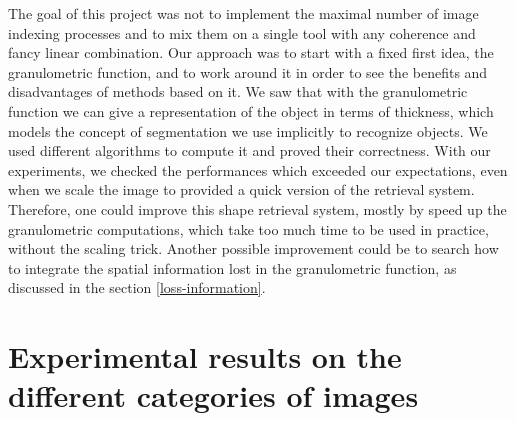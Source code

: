 The goal of this project was not to implement the maximal number of image indexing processes and to mix them on a single tool with any coherence and fancy linear combination. Our approach was to start with a fixed first idea, the granulometric function, and to work around it in order to see the benefits and disadvantages of methods based on it. We saw that with the granulometric function we can give a representation of the object in terms of thickness, which models the concept of segmentation we use implicitly to recognize objects. We used different algorithms to compute it and proved their correctness. With our experiments, we checked the performances which exceeded our expectations, even when we scale the image to provided a quick version of the retrieval system. Therefore, one could improve this shape retrieval system, mostly by speed up the granulometric computations, which take too much time to be used in practice, without the scaling trick. Another possible improvement could be to search how to integrate the spatial information lost in the granulometric function, as discussed in the section \ref{loss-information}.




\newpage

\appendix

\section{Experimental results on the different categories of images}


